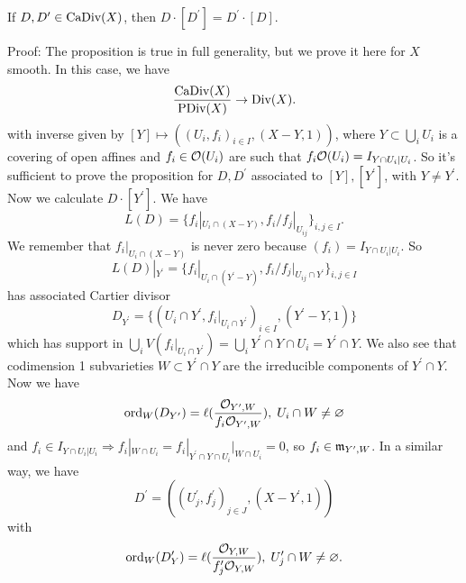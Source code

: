 \begin{dang}
    \begin{proposition}
        If $D,D^\prime\in\text{CaDiv}(X)$, then $D\cdot [D^\prime] = D^\prime\cdot [D]$.
    \end{proposition}
\end{dang}
Proof: The proposition is true in full generality, but we prove it here for $X$ smooth. In this case, we have 
\begin{equation}
    \frac{\text{CaDiv}(X)}{\text{PDiv}(X)}\to \text{Div}(X).
\end{equation}
with inverse given by $[Y]\mapsto ((U_i, f_i)_{i\in I}, (X-Y,1))$, where 
$Y\subset\bigcup_i U_i$ is a covering of open affines and $f_i\in\mathcal{O}(U_i)$ are such that 
$f_i\mathcal{O}(U_i) = I_{Y\cap U_i|U_i}$. So it's sufficient to prove the proposition for 
$D,D^\prime$ associated to $[Y], [Y^\prime]$, with $Y\neq Y^\prime$. Now we calculate $D\cdot [Y^\prime]$. 
We have 
\begin{equation}
    L(D) = \{f_i|_{U_i\cap (X-Y)}, f_i/f_j|_{U_{ij}}\}_{i,j\in I}.
\end{equation}
We remember that $f_i|_{U_i\cap (X-Y)}$ is never zero because $(f_i)=I_{Y\cap U_i| U_i}$. So 
\begin{equation}
    L(D)|_{Y^\prime} =\{f_i|_{U_i\cap (Y^\prime - Y)}, f_i/f_j|_{U_{ij}\cap Y^\prime}\}_{i,j\in I} 
\end{equation}
has associated Cartier divisor 
\begin{equation}
    D_{Y^\prime}=\{(U_i\cap Y^\prime, f_i|_{U_i\cap Y^\prime})_{i \in I},(Y^\prime - Y,1)\}
\end{equation}
which has support in $\bigcup_i V(f_i|_{U_i\cap Y^\prime}) = \bigcup_i Y^\prime\cap Y\cap U_i = Y^\prime \cap Y$. We also 
see that codimension 1 subvarieties $W\subset Y^\prime\cap Y$ are the irreducible components of $Y^\prime\cap Y$. Now we have 
\begin{equation}
    \text{ord}_W(D_{Y^\prime})=\ell(\frac{\mathcal{O}_{Y^\prime, W}}{f_i\mathcal{O}_{Y^\prime, W}}),\; U_i\cap W\neq\varnothing
\end{equation}
and $f_i\in I_{Y\cap U_i|U_i}\Rightarrow f_i|_{W\cap U_i}=f_i|_{Y^\prime\cap Y\cap U_i}|_{W\cap U_i}=0$, so 
$f_i\in \mathfrak{m}_{Y^\prime, W}$. In a similar way, we have 
\begin{equation}
    D^\prime = ((U_j^\prime, f_j^\prime)_{j\in J}, (X-Y^\prime,1))
\end{equation}
with 
\begin{equation}
    \text{ord}_W(D^\prime_Y) =\ell(\frac{\mathcal{O}_{Y,W}}{f_j^\prime\mathcal{O}_{Y,W}}),\; U_j^\prime\cap W\neq\varnothing.
\end{equation}
